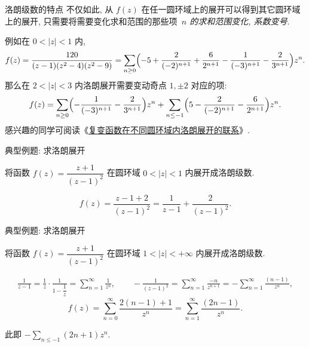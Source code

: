 \begin{frame}{洛朗级数的特点\noexer}
	\onslide<+->
	不仅如此, 从 $f(z)$ 在任一圆环域上的展开可以得到其它圆环域上的展开,
	\onslide<+->
	只需要将需要变化求和范围的那些项{\itshape\ $n$ 的求和范围变化, 系数变号}.

	\onslide<+->
	例如在 $0<|z|<1$ 内,
	\[f(z)=\frac{120}{(z-1)(z^2-4)(z^2-9)}=\sum_{n\ge 0}\Bigl(-5+\frac2{(-2)^{n+1}}+\frac6{2^{n+1}}-\frac1{(-3)^{n+1}}-\frac2{3^{n+1}}\Bigr)z^n.
	\]
	\onslide<+->
	那么在 $2<|z|<3$ 内洛朗展开需要变动奇点 $1,\pm2$ 对应的项:
	\[f(z)=\sum_{n\ge 0}\Bigl(-\frac1{(-3)^{n+1}}-\frac2{3^{n+1}}\Bigr)z^n+\sum_{n\le-1}\Bigl(5-\frac2{(-2)^{n+1}}-\frac6{2^{n+1}}\Bigr)z^n.
	\]
	\onslide<+->
	感兴趣的同学可阅读《\alert{\href{https://zhangshenxing.gitee.io/teaching/publications/袁志杰张神星2023 复变函数在不同圆环域内洛朗展开的联系.pdf}{复变函数在不同圆环域内洛朗展开的联系}}》.
\end{frame}


\begin{frame}{典型例题: 求洛朗展开}
	\onslide<+->
	\begin{example}
		将函数 $f(z)=\dfrac{z+1}{(z-1)^2}$ 在圆环域 $0<|z|<1$ 内展开成洛朗级数.
	\end{example}

	\onslide<+->
	\begin{solution}
	\[
		f(z)=\frac{z-1+2}{(z-1)^2}=\frac1{z-1}+\frac{2}{(z-1)^2}.
	\]
		\onslide<+->{%
			\[f(z)=\sum_{n=0}^\infty \bigl(2(n+1)-1\bigr)z^n
			=\sum_{n=0}^\infty(2n+1)z^n.\]%
		}
	\end{solution}
\end{frame}


\begin{frame}{典型例题: 求洛朗展开}
	\onslide<+->
	\begin{exercise}
		将函数 $f(z)=\dfrac{z+1}{(z-1)^2}$ 在圆环域 $1<|z|<+\infty$ 内展开成洛朗级数.
	\end{exercise}
	\onslide<+->
	\begin{answer}
		\begin{align*}
			\frac1{z-1}=\frac1z\cdot\frac1{1-\dfrac1z}=\sum_{n=1}^{\infty} \frac1{z^n},\qquad
			-\frac1{(z-1)^2}=\sum_{n=1}^\infty \frac{-n}{z^{n+1}}=-\sum_{n=1}^\infty \frac{(n-1)}{z^n},
		\end{align*}
			\[f(z)=\sum_{n=0}^\infty \frac{2(n-1)+1}{z^n}
			=\sum_{n=1}^\infty\frac{(2n-1)}{z^n}.
	\]
	\end{answer}
	\onslide<+->
	此即 $\displaystyle -\sum_{n\le -1}(2n+1)z^n$.
\end{frame}


